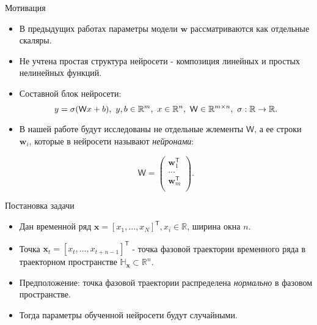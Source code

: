 \documentclass{beamer}
\begin{document}
\begin{frame}{Мотивация}
\begin{itemize}

    \item В предыдущих работах параметры модели $\mathbf{w}$ рассматриваются как отдельные скаляры.
    \item Не учтена простая структура нейросети -  композиция линейных и простых нелинейных функций.
    \item Составной блок нейросети:
        \[y=\sigma(\mathsf{W}x + b),\\ \ y, b \in \mathbb{R}^m, \ x \in \mathbb{R}^n, \ \mathsf{W} \in \mathbb{R}^{m \times n}, \ \sigma: \mathbb{R} \to \mathbb{R}.\]
    \item В нашей работе будут исследованы не отдельные жлементы $\mathsf{W}$, а ее строки $\mathbf{w}_i$, которые в нейросети называют \textit{нейронами}:

    \[\mathsf{W} = \begin{pmatrix}
\mathbf{w}_1^{\mathsf{T}}\\
\dots\\
\mathbf{w}_m^{\mathsf{T}}\\
\end{pmatrix}.\]
\end{itemize}
\end{frame}




\begin{frame}{Постановка задачи}
\begin{itemize}
    \item Дан временной ряд  $\mathbf{x} = [x_1, \dots, x_N]^{\mathsf{T}}, x_i \in \mathbb{R}$, ширина окна $n$.
    \item Точка $\mathbf{x}_t = [x_t, \dots, x_{t + n - 1}]^{\mathsf{T}}$ - точка фазовой траектории временного ряда в траекторном пространстве $\mathbb{H}_{\mathbf{x}} \subset \mathbb{R}^n$.
    \item Предположение: точка фазовой траектории распределена               \textit{нормально} в фазовом пространстве.
    \item Тогда параметры обученной нейросети будут случайными.
\end{itemize}
\end{frame}
\end{document}
